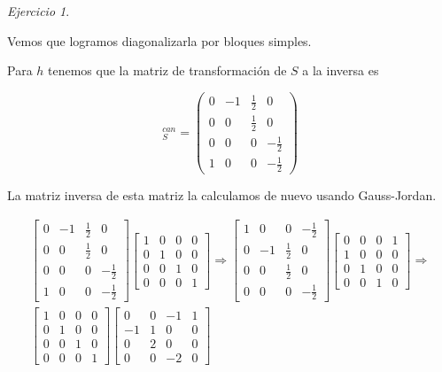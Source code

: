 \documentclass[11pt,a4paper]{article}
\theoremstyle{definition}
\theoremstyle{remark}
\newtheorem{exc}{Ejercicio}
\begin{document}
\begin{exc}
\begin{enumerate}
		Vemos que logramos diagonalizarla por bloques simples.
		
		Para $ h $ tenemos que la matriz de transformación de $ S $ a la inversa es
		
		\begin{equation}
		[id]_{S}^{can} = 
		\begin{pmatrix}
		0 & -1 & \frac{1}{2} & 0
		\\ 0 & 0 & \frac{1}{2} & 0
		\\ 0 & 0 & 0 & -\frac{1}{2}  
		\\ 1 & 0 & 0 & -\frac{1}{2}
		\end{pmatrix} \nonumber
		\end{equation}
		
		La matriz inversa de esta matriz la calculamos de nuevo usando Gauss-Jordan.
		
		\begin{multline}
		\begin{bmatrix}
		0 & -1 & \frac{1}{2} & 0
		\\ 0 & 0 & \frac{1}{2} & 0
		\\ 0 & 0 & 0 & -\frac{1}{2}  
		\\ 1 & 0 & 0 & -\frac{1}{2}
		\end{bmatrix}
		\begin{bmatrix}
		1 & 0 & 0 & 0
		\\ 0 & 1 & 0 & 0
		\\ 0 & 0 & 1 & 0  
		\\ 0 & 0 & 0 & 1
		\end{bmatrix} \nonumber \Rightarrow
		\begin{bmatrix}
		1 & 0 & 0 & -\frac{1}{2}
		\\ 0 & -1 & \frac{1}{2} & 0
		\\ 0 & 0 & \frac{1}{2} & 0
		\\ 0 & 0 & 0 & -\frac{1}{2}  
		\end{bmatrix}
		\begin{bmatrix}
		0 & 0 & 0 & 1
		\\ 1 & 0 & 0 & 0
		\\ 0 & 1 & 0 & 0
		\\ 0 & 0 & 1 & 0  		
		\end{bmatrix} \Rightarrow
		\\
		\begin{bmatrix}
		1 & 0 & 0 & 0
		\\ 0 & 1 & 0 & 0
		\\ 0 & 0 & 1 & 0
		\\ 0 & 0 & 0 & 1  
		\end{bmatrix}
		\begin{bmatrix}
 		0 & 0 & -1 & 1
 		\\ -1 & 1 & 0 & 0
 		\\ 0 & 2 & 0 & 0
 		\\ 0 & 0 & -2 & 0  		
 		\end{bmatrix}
		\end{multline}
		

\end{enumerate}
\end{exc}
\end{document}
